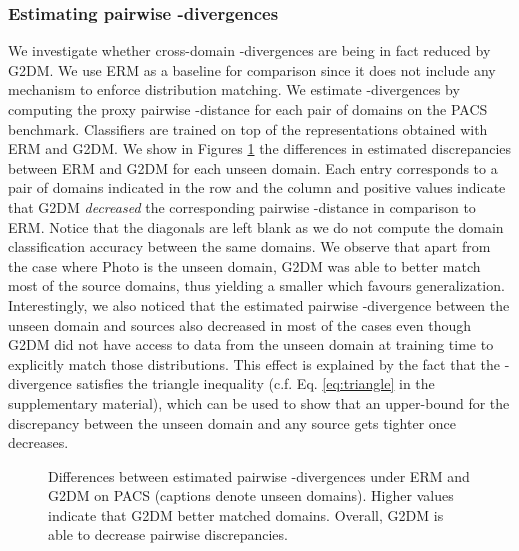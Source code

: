 \documentclass{article}
\begin{document}
\vspace{0.3cm}
\subsubsection{Estimating pairwise -divergences} We investigate whether cross-domain -divergences are being in fact reduced by G2DM. We use ERM as a baseline for comparison since it does not include any mechanism to enforce distribution matching. We estimate -divergences by computing the proxy pairwise -distance \cite{ben2007analysis} for each pair of domains on the PACS benchmark. Classifiers are trained on top of the representations  obtained with ERM and G2DM. We show in Figures \ref{fig:a_dist} the differences in estimated discrepancies between ERM and G2DM for each unseen domain. Each entry corresponds to a pair of domains indicated in the row and the column and positive values indicate that G2DM \emph{decreased} the corresponding pairwise -distance in comparison to ERM. Notice that the diagonals are left blank as we do not compute the domain classification accuracy between the same domains. We observe that apart from the case where Photo is the unseen domain, G2DM was able to better match most of the source domains, thus yielding a smaller  which favours generalization. Interestingly, we also noticed that the estimated pairwise -divergence between the unseen domain and sources also decreased in most of the cases even though G2DM did not have access to data from the unseen domain at training time to explicitly match those distributions. This effect is explained by the fact that the -divergence satisfies the triangle inequality (c.f. Eq. \ref{eq:triangle} in the supplementary material), which can be used to show that an upper-bound for the discrepancy between the unseen domain and any source gets tighter once  decreases. 
\begin{figure}[h]
	\centering
	\;
    \;
	\;
	\caption{Differences between estimated pairwise -divergences under ERM and G2DM on PACS (captions denote unseen domains). Higher values indicate that G2DM better matched domains. Overall, G2DM is able to decrease pairwise discrepancies.}
	\label{fig:a_dist}
 \end{figure}
\end{document}
